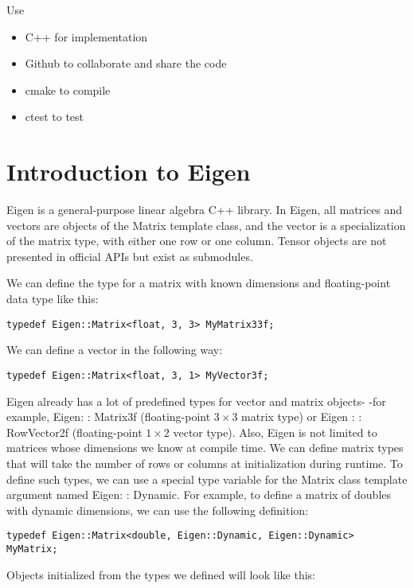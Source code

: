 \documentclass[12pt]{article}
\begin{document}
Use 
\begin{itemize}
    \item C++ for implementation
    \item Github to collaborate and share the code
    \item cmake to compile
    \item ctest to test
\end{itemize}
\section{Introduction to Eigen}

Eigen is a general-purpose linear algebra C++ library. In Eigen, all matrices and vectors are objects of the Matrix template class, and the vector is a specialization of the matrix type, with either one row or one column. Tensor objects are not presented in official APIs but exist as submodules.

We can define the type for a matrix with known dimensions and floating-point data type like this:

\begin{verbatim}
typedef Eigen::Matrix<float, 3, 3> MyMatrix33f;
\end{verbatim}

We can define a vector in the following way:

\begin{verbatim}
typedef Eigen::Matrix<float, 3, 1> MyVector3f;
\end{verbatim}

Eigen already has a lot of predefined types for vector and matrix objects- -for example, Eigen: : Matrix3f (floating-point $3 \times 3$ matrix type) or Eigen : : RowVector2f (floating-point $1 \times 2$ vector type). Also, Eigen is not limited to matrices whose dimensions we know at compile time. We can define matrix types that will take the number of rows or columns at initialization during runtime. To define such types, we can use a special type variable for the Matrix class template argument named Eigen: : Dynamic. For example, to define a matrix of doubles with dynamic dimensions, we can use the following definition:

\begin{verbatim}
typedef Eigen::Matrix<double, Eigen::Dynamic, Eigen::Dynamic> MyMatrix;
\end{verbatim}

Objects initialized from the types we defined will look like this:
\end{document}
